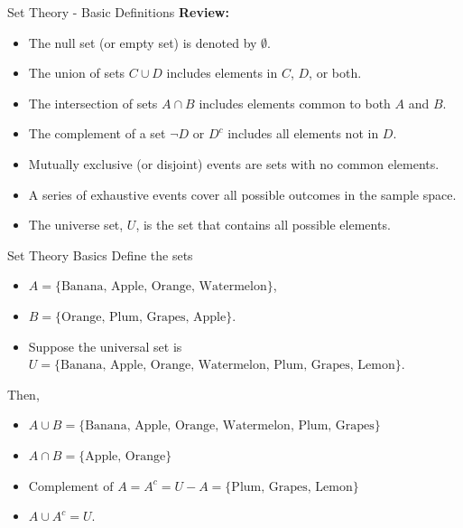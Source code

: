 \documentclass[handout]{beamer} %
\begin{document}
\begin{frame}{Set Theory - Basic Definitions}
    \textbf{Review:}
    \begin{itemize}
        \item The null set (or empty set) is denoted by \(\emptyset\).\pause
        \item The union of sets \(C \cup D\) includes elements in \(C\), \(D\), or both.\pause
        \item The intersection of sets \(A \cap B\) includes elements common to both \(A\) and \(B\).\pause
        \item The complement of a set $\neg D$ or \(D^c\) includes all elements not in \(D\).\pause
        \item Mutually exclusive (or disjoint) events are sets with no common elements.\pause
        \item A series of exhaustive events cover all possible outcomes in the sample space.\pause
        \item The universe set, $U$, is the set that contains all possible elements.
    \end{itemize}
\end{frame}


\begin{frame}{Set Theory Basics}
    Define the sets 
    \begin{itemize}
        \item $A = \{\text{Banana, Apple, Orange, Watermelon}\}$, \pause
        \item $B = \{\text{Orange, Plum, Grapes, Apple}\}$. \pause
        \item Suppose the universal set is $U = \{\text{Banana, Apple, Orange, Watermelon, Plum, Grapes, Lemon}\}$.\pause
    \end{itemize}
    Then,\pause
    \begin{itemize}
        \item $A \cup B = \{\text{Banana, Apple, Orange, Watermelon, Plum, Grapes}\}$\pause
        \item $A \cap B = \{\text{Apple, Orange}\}$\pause
        \item $\text{Complement of } A = A^c = U - A = \{\text{Plum, Grapes, Lemon}\}$
        \item $A \cup A^c = U$.
    \end{itemize}
\end{frame}

\end{document}
